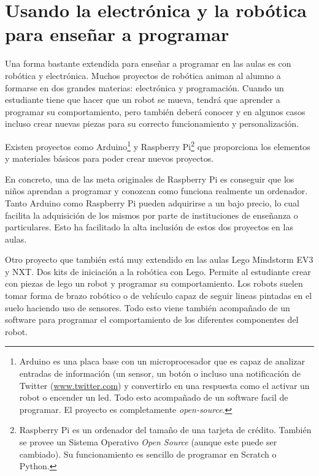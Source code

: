 \section{Usando la electrónica y la robótica para enseñar a programar}
\label{sec:electronica-robotica}


Una forma bastante extendida para enseñar a programar en las aulas es con robótica y electrónica. Muchos proyectos de robótica animan al alumno a formarse en dos grandes materias: electrónica y programación. Cuando un estudiante tiene que hacer que un robot se mueva, tendrá que aprender a programar su comportamiento, pero también deberá conocer y en algunos casos incluso crear nuevas piezas para su correcto funcionamiento y personalización. 

Existen proyectos como Arduino\footnote{Arduino es una placa base con un microprocesador que es capaz de analizar entradas de información (un sensor, un botón o incluso una notificación de Twitter (\url{www.twitter.com}) y convertirlo en una respuesta como el activar un robot o encender un led. Todo esto acompañado de un software facil de programar. El proyecto es completamente \emph{\gls{open-source}}.}\cite{arduino} y Raspberry Pi\footnote{Raspberry Pi es un ordenador del tamaño de una tarjeta de crédito. También se provee un Sistema Operativo \emph{Open Source} (aunque este puede ser cambiado). Su funcionamiento es sencillo de programar en Scratch\cite{scratch} o Python\cite{python,lutz2013learning}.}\cite{raspberry-pi} que proporciona {\color{red}los elementos y materiales} básicos para poder crear nuevos proyectos. 

En concreto, una de las meta originales de Raspberry Pi es conseguir que los niños aprendan a programar y conozcan como funciona realmente un ordenador. Tanto Arduino como Raspberry Pi pueden adquirirse a un bajo precio, lo cual facilita la adquisición de los mismos por parte de instituciones de enseñanza o particulares. Esto ha facilitado la alta inclusión de estos dos proyectos en las aulas.

Otro proyecto que también está muy extendido en las aulas Lego Mindstorm EV3 y NXT. Dos kits de iniciación a la robótica con Lego. Permite al estudiante crear con piezas de lego un robot y programar su comportamiento. Los robots suelen tomar forma de brazo robótico o de vehículo capaz de seguir lineas pintadas en el suelo haciendo uso de sensores. Todo esto viene también acompañado de un software para programar el comportamiento de los diferentes componentes del robot.


